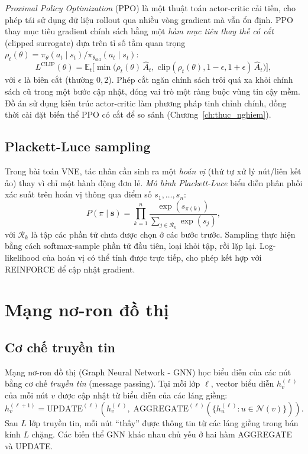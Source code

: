 \documentclass[../DoAn.tex]{subfiles}
\begin{document}
\textit{Proximal Policy Optimization} (PPO)\cite{schulman2017ppo} là một thuật toán actor-critic cải tiến, cho phép tái sử dụng dữ liệu rollout qua nhiều vòng gradient mà vẫn ổn định. PPO thay mục tiêu gradient chính sách bằng một \textit{hàm mục tiêu thay thế có cắt} (clipped surrogate) dựa trên tỉ số tầm quan trọng $\rho_t(\theta) = \pi_\theta(a_t\mid s_t)/\pi_{\theta_{\text{old}}}(a_t\mid s_t)$:
\begin{equation}
    L^{\text{CLIP}}(\theta) = \mathbb{E}_t\Big[ \min\big( \rho_t(\theta)\,\hat{A}_t,\; \mathrm{clip}(\rho_t(\theta), 1-\epsilon, 1+\epsilon)\,\hat{A}_t \big) \Big],
    \label{eq:ppo-clip}
\end{equation}
với $\epsilon$ là biên cắt (thường $0{,}2$). Phép cắt ngăn chính sách trôi quá xa khỏi chính sách cũ trong một bước cập nhật, đóng vai trò một ràng buộc vùng tin cậy mềm. Đồ án sử dụng kiến trúc actor-critic làm phương pháp tinh chỉnh chính, đồng thời cài đặt biến thể PPO có cắt để so sánh (Chương~\ref{ch:thuc_nghiem}).

\subsection{Plackett-Luce sampling}

Trong bài toán VNE, tác nhân cần sinh ra một \textit{hoán vị} (thứ tự xử lý nút/liên kết ảo) thay vì chỉ một hành động đơn lẻ. \textit{Mô hình Plackett-Luce}\cite{plackett1975ranking} biểu diễn phân phối xác suất trên hoán vị thông qua điểm số $s_1, \ldots, s_n$:
\begin{equation}
    P(\pi \mid \mathbf{s}) = \prod_{k=1}^{n} \frac{\exp(s_{\pi(k)})}{\sum_{j \in \mathcal{R}_k} \exp(s_j)},
    \label{eq:pl}
\end{equation}
với $\mathcal{R}_k$ là tập các phần tử chưa được chọn ở các bước trước. Sampling thực hiện bằng cách softmax-sample phần tử đầu tiên, loại khỏi tập, rồi lặp lại. Log-likelihood của hoán vị có thể tính được trực tiếp, cho phép kết hợp với REINFORCE để cập nhật gradient.

\section{Mạng nơ-ron đồ thị}
\label{sec:gnn}

\subsection{Cơ chế truyền tin}

Mạng nơ-ron đồ thị (Graph Neural Network - GNN) học biểu diễn của các nút bằng cơ chế \textit{truyền tin} (message passing). Tại mỗi lớp $\ell$, vector biểu diễn $h_v^{(\ell)}$ của mỗi nút $v$ được cập nhật từ biểu diễn của các láng giềng:
\begin{equation}
    h_v^{(\ell+1)} = \text{UPDATE}^{(\ell)}\left( h_v^{(\ell)},\; \text{AGGREGATE}^{(\ell)}\left( \{h_u^{(\ell)} : u \in \mathcal{N}(v)\} \right) \right).
\end{equation}
Sau $L$ lớp truyền tin, mỗi nút ``thấy'' được thông tin từ các láng giềng trong bán kính $L$ chặng. Các biến thể GNN khác nhau chủ yếu ở hai hàm AGGREGATE và UPDATE.
\end{document}
